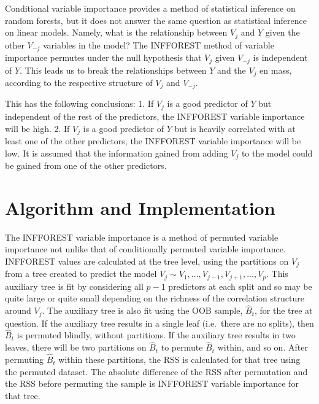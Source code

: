 \documentclass[12pt,twoside]{reedthesis}
\begin{document}
  Conditional variable importance provides a method of statistical
  inference on random forests, but it does not answer the same question as
  statistical inference on linear models. Namely, what is the relationship
  between \(V_j\) and \(Y\) given the other \(V_{-j}\) variables in the
  model? The INFFOREST method of variable importance permutes under the
  null hypothesis that \(V_j\) given \(V_{-j}\) is independent of \(Y\).
  This leads us to break the relationships between \(Y\) and the \(V_j\)
  en mass, according to the respective structure of \(V_j\) and
  \(V_{-j}\).
  
  \usetikzlibrary{positioning}
  
  \begin{center}
  \end{center}
  
  This has the following conclusions: 1. If \(V_j\) is a good predictor of
  \(Y\) but independent of the rest of the predictors, the INFFOREST
  variable importance will be high. 2. If \(V_j\) is a good predictor of
  \(Y\) but is heavily correlated with at least one of the other
  predictors, the INFFOREST variable importance will be low. It is assumed
  that the information gained from adding \(V_j\) to the model could be
  gained from one of the other predictors.
  
  \section{Algorithm and
  Implementation}\label{algorithm-and-implementation}
  
  The INFFOREST variable importance is a method of permuted variable
  importance not unlike that of conditionally permuted variable
  importance. INFFOREST values are calculated at the tree level, using the
  partitions on \(V_j\) from a tree created to predict the model
  \(V_j \sim V_1,..., V_{j-1}, V_{j+1},...,V_p\). This auxiliary tree is
  fit by considering all \(p-1\) predictors at each split and so may be
  quite large or quite small depending on the richness of the correlation
  structure around \(V_j\). The auxiliary tree is also fit using the OOB
  sample, \(\hat{B}_t\), for the tree at question. If the auxiliary tree
  results in a single leaf (i.e.~there are no splits), then \(\hat{B}_t\)
  is permuted blindly, without partitions. If the auxiliary tree results
  in two leaves, there will be two partitions on \(\hat{B}_t\) to permute
  \(\hat{B}_t\) within, and so on. After permuting \(\hat{B}_t\) within
  these partitions, the RSS is calculated for that tree using the permuted
  dataset. The absolute difference of the RSS after permutation and the
  RSS before permuting the sample is INFFOREST variable importance for
  that tree.
  
\end{document}

